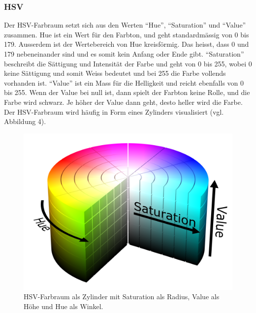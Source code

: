 \documentclass[a4paper, 12pt]{article}
\begin{document}
\subsubsection{HSV}
Der HSV-Farbraum setzt sich aus den Werten "`Hue"', "`Saturation"' und "`Value"' zusammen. Hue ist ein Wert für den Farbton, und geht standardmässig von 0 bis 179. Ausserdem ist der Wertebereich von Hue kreisförmig. Das heisst, dass 0 und 179 nebeneinander sind und es somit kein Anfang oder Ende gibt.
\newline
"`Saturation"' beschreibt die Sättigung und Intensität der Farbe und geht von 0 bis 255, wobei 0 keine Sättigung und somit Weiss bedeutet und bei 255 die Farbe vollends vorhanden ist.
\newline
"`Value"' ist ein Mass für die Helligkeit und reicht ebenfalls von 0 bis 255. Wenn der Value bei null ist, dann spielt der Farbton keine Rolle, und die Farbe wird schwarz. Je höher der Value dann geht, desto heller wird die Farbe. \cite{RGBHSV}
\newline
Der HSV-Farbraum wird häufig in Form eines Zylinders visualisiert (vgl. Abbildung 4).
\begin{figure}[h]
\includegraphics[scale=0.07]{HSV_Zylinder} 
\caption{HSV-Farbraum als Zylinder mit Saturation als Radius, Value als Höhe und Hue als Winkel. \cite{RGBHSV}}
\end{figure}
\end{document}
